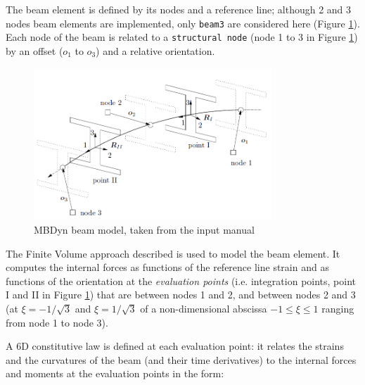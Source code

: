 The beam element is defined by its nodes and a reference line; although 2 and 3 nodes beam elements are implemented, only \texttt{beam3} are considered here (Figure \ref{fig:mbdyn-beam-model}). Each node of the beam is related to a \texttt{structural node} (node 1 to 3 in Figure \ref{fig:mbdyn-beam-model}) by an offset ($o_1$ to $o_3$) and a relative orientation.

\begin{figure}[htbp!]
	\centering
	\includegraphics[width=0.8\textwidth]{images/beam_model}
	\caption{MBDyn beam model, taken from the input manual}
	\label{fig:mbdyn-beam-model}
\end{figure}


The Finite Volume approach described \cite{ghiringhelli2000multibody} is used to model the beam element. It computes the internal forces as functions of the reference line strain and as functions of the  orientation at the \textit{evaluation points} (i.e. integration points, point I and II in Figure \ref{fig:mbdyn-beam-model}) that are between nodes 1 and 2, and between nodes 2 and 3 (at $\xi =-1/\sqrt{3}$ and $\xi = 1/\sqrt{3}$ of a non-dimensional abscissa $-1\leq \xi \leq 1$ ranging from node 1 to node 3).


A 6D constitutive law is defined at each evaluation point: it relates the strains and the curvatures of the beam (and their time derivatives) to the internal forces and moments at the evaluation points in the form:

